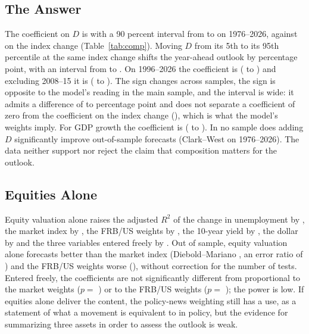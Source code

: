\documentclass[11pt]{article}
\begin{document}
\subsection{The Answer}\label{sec:answer}
The coefficient on $D$ is  with a 90 percent interval from  to  on 1976--2026, against  on the index change (Table~\ref{tab:comp}). Moving $D$ from its 5th to its 95th percentile at the same index change shifts the year-ahead outlook by  percentage point, with an interval from  to . On 1996--2026 the coefficient is  ( to ) and excluding 2008--15 it is  ( to ). The sign changes across samples, the sign is opposite to the model's reading in the main sample, and the interval is wide: it admits a difference of  to  percentage point and does not separate a coefficient of zero from the coefficient on the index change (), which is what the model's weights imply. For GDP growth the coefficient is  ( to ). In no sample does adding $D$ significantly improve out-of-sample forecasts (Clark--West  on 1976--2026). The data neither support nor reject the claim that composition matters for the outlook.



\subsection{Equities Alone}\label{sec:eqalone}
Equity valuation alone raises the adjusted $R^2$ of the change in unemployment by , the market index by , the FRB/US weights by , the 10-year yield by , the dollar by  and the three variables entered freely by . Out of sample, equity valuation alone forecasts better than the market index (Diebold--Mariano , an error ratio of ) and the FRB/US weights worse (), without correction for the number of tests. Entered freely, the coefficients are not significantly different from proportional to the market weights ($p=$ ) or to the FRB/US weights ($p=$ ); the power is low. If equities alone deliver the content, the policy-news weighting still has a use, as a statement of what a movement is equivalent to in policy, but the evidence for summarizing three assets in order to assess the outlook is weak.
\end{document}
